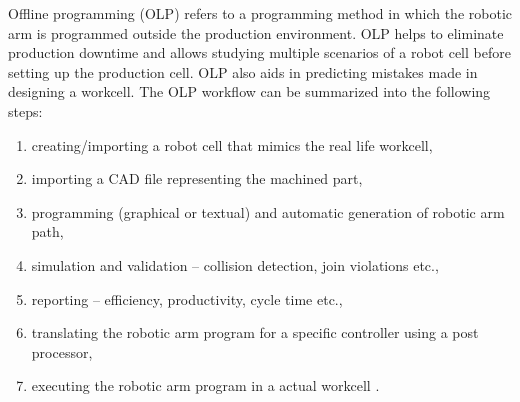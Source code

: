 Offline programming  (OLP) refers to a programming method in which the robotic arm is programmed outside the production environment. OLP helps to eliminate production downtime and allows studying multiple scenarios of a robot cell before setting up the production cell. OLP also aids in predicting mistakes made in designing a workcell. The OLP workflow can be summarized into the following steps:

\begin{enumerate}
  \item creating/importing a robot cell that mimics the real life workcell,
  \item importing a CAD file representing the machined part,
  \item programming (graphical or textual) and automatic generation of robotic arm path,
  \item simulation and validation -- collision detection, join violations etc.,
  \item reporting -- efficiency, productivity, cycle time etc.,
  \item translating the robotic arm program for a specific controller using a post processor,
  \item executing the robotic arm program in a actual workcell \cite{offlinesteps}.
\end{enumerate}



